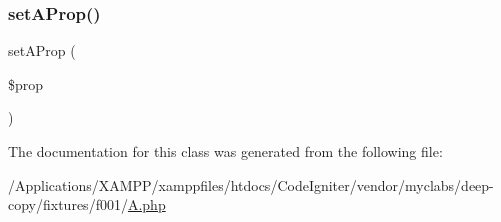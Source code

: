 \subsubsection{\texorpdfstring{set\+A\+Prop()}{setAProp()}}
{\footnotesize\ttfamily set\+A\+Prop (\begin{DoxyParamCaption}\item[{}]{\$prop }\end{DoxyParamCaption})}



The documentation for this class was generated from the following file\+:\begin{DoxyCompactItemize}
\item 
/\+Applications/\+X\+A\+M\+P\+P/xamppfiles/htdocs/\+Code\+Igniter/vendor/myclabs/deep-\/copy/fixtures/f001/\mbox{\hyperlink{f001_2_a_8php}{A.\+php}}\end{DoxyCompactItemize}
